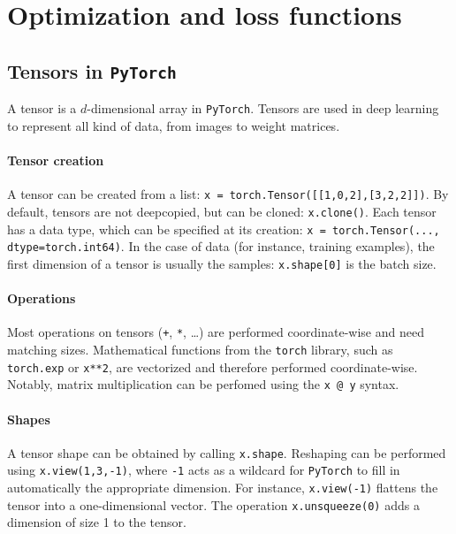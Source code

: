\section{Optimization and loss functions}
\subsection{Tensors in \texttt{PyTorch}}
A tensor is a $d$-dimensional array in \texttt{PyTorch}. Tensors are used in deep learning to represent all kind of data, from images to weight matrices. 

\paragraph*{Tensor creation}
A tensor can be created from a list: \texttt{x = torch.Tensor([[1,0,2],[3,2,2]])}. By default, tensors are not deepcopied, but can be cloned: \texttt{x.clone()}. Each tensor has a data type, which can be specified at its creation: \texttt{x = torch.Tensor(..., dtype=torch.int64)}. In the case of data (for instance, training examples), the first dimension of a tensor is usually the samples: \texttt{x.shape[0]} is the batch size.

\paragraph*{Operations}
Most operations on tensors (\texttt{+}, \texttt{*}, \dots) are performed coordinate-wise and need matching sizes. Mathematical functions from the \texttt{torch} library, such as \texttt{torch.exp} or \texttt{x**2}, are vectorized and therefore performed coordinate-wise. Notably, matrix multiplication can be perfomed using the \texttt{x @ y} syntax.

\paragraph*{Shapes}
A tensor shape can be obtained by calling \texttt{x.shape}. Reshaping can be performed using \texttt{x.view(1,3,-1)}, where \texttt{-1} acts as a wildcard for \texttt{PyTorch} to fill in automatically the appropriate dimension. For instance, \texttt{x.view(-1)} flattens the tensor into a one-dimensional vector. The operation \texttt{x.unsqueeze(0)} adds a dimension of size 1 to the tensor.

